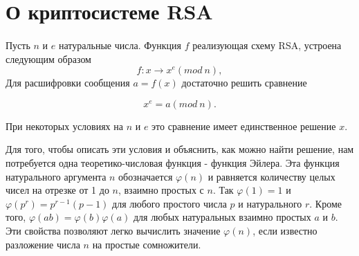 \section*{О криптосистеме RSA}

\paragraph{} Пусть $n$ и $e$ натуральные числа. Функция $f$ реализующая схему RSA, устроена следующим образом
\begin{equation} \label{eq:intro-rsa-f}
  f : x \rightarrow x^{e} (mod \: n),
\end{equation}
Для расшифровки сообщения $a = f(x)$ достаточно решить сравнение 

\begin{equation} \label{eq:intro-rsa-xe}
  x^{e} = a (mod \: n). 
\end{equation}

При некоторых условиях на $n$ и $e$ это сравнение имеет единственное решение $x$.

  Для того, чтобы описать эти условия и объяснить, как можно найти решение, нам потребуется одна теоретико-числовая функция - функция Эйлера. 
Эта функция натурального аргумента $n$ обозначается $\varphi(n)$ и равняется количеству целых чисел на отрезке от 1 до $n$, 
взаимно простых с $n$. Так $\varphi(1) = 1$ и $\varphi(p^{ r}) = p^{ r - 1}(p - 1)$ 
для любого простого числа $p$ и натурального $r$. Кроме того, $\varphi(a b) = \varphi(b) \varphi(a)$ 
для любых натуральных взаимно простых $a$ и $b$. Эти свойства позволяют легко вычислить значение $\varphi(n)$, если известно 
разложение числа $n$ на простые сомножители. 

